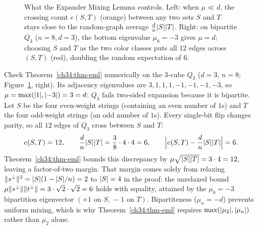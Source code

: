 \begin{figure}[htbp]
\caption{What the Expander Mixing Lemma controls. Left: when $\mu\ll d$, the crossing count $e(S,T)$ (orange) between any two sets $S$ and $T$ stays close to the random-graph average $\frac{d}{n}\lvert S\rvert\lvert T\rvert$. Right: on bipartite $Q_3$ ($n=8,d=3$), the bottom eigenvalue $\mu_8=-3$ gives $\mu=d$; choosing $S$ and $T$ as the two color classes puts all $12$ edges across $(S,T)$ (red), doubling the random expectation of $6$.}
\label{ch34:fig-eml}
\end{figure}

\begin{labbox}
Check Theorem~\ref{ch34:thm-eml} numerically on the $3$-cube $Q_3$ ($d=3$, $n=8$; Figure~\ref{ch34:fig-eml}, right). Its adjacency eigenvalues are $3,1,1,1,-1,-1,-1,-3$, so $\mu=\max(\lvert1\rvert,\lvert-3\rvert)=3=d$: $Q_3$ fails two-sided expansion because it is bipartite. Let $S$ be the four even-weight strings (containing an even number of $1$s) and $T$ the four odd-weight strings (an odd number of $1$s). Every single-bit flip changes parity, so all $12$ edges of $Q_3$ cross between $S$ and $T$:
\[
  e(S,T) = 12, \qquad \frac{d}{n}\lvert S\rvert\lvert T\rvert = \frac{3}{8}\cdot 4\cdot 4 = 6, \qquad \Bigl\lvert e(S,T)-\frac{d}{n}\lvert S\rvert\lvert T\rvert\Bigr\rvert = 6.
\]
Theorem~\ref{ch34:thm-eml} bounds this discrepancy by $\mu\sqrt{\lvert S\rvert\lvert T\rvert}=3\cdot 4=12$, leaving a factor-of-two margin. That margin comes solely from relaxing $\lVert s^\perp\rVert^2 = \lvert S\rvert(1-\lvert S\rvert/n) = 2$ to $\lvert S\rvert=4$ in the proof: the unrelaxed bound $\mu\lVert s^\perp\rVert\lVert t^\perp\rVert=3\cdot\sqrt{2}\cdot\sqrt{2}=6$ holds with equality, attained by the $\mu_8=-3$ bipartition eigenvector $(+1\text{ on }S,\,-1\text{ on }T)$. Bipartiteness ($\mu_n=-d$) prevents uniform mixing, which is why Theorem~\ref{ch34:thm-eml} requires $\max(\lvert\mu_2\rvert,\lvert\mu_n\rvert)$ rather than $\mu_2$ alone.
\end{labbox}

